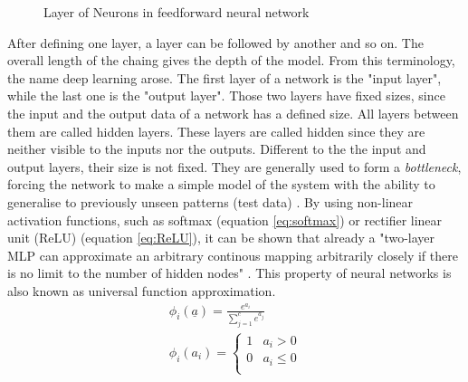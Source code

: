 \documentclass[12pt,DIV14,BCOR12mm,a4paper,footexclude,headinclude,halfparskip-,twoside,openright,openany,cleardoubleempty,idxtotoc,bibtotoc]{scrreprt} %
\numberwithin{equation}{chapter}
\begin{document}
\begin{figure}[htb!]
	\centering
	\qquad
	\caption{Layer of Neurons in feedforward neural network}
	\label{fig:Layer_of_neurons}
\end{figure}
After defining one layer, a layer can be followed by another and so on. The overall length of the chaing gives the depth of the model. From this terminology, the name deep learning arose. The first layer of a network is the "input layer", while the last one is the "output layer". Those two layers have fixed sizes, since the input and the output data of a network has a defined size. All layers between them are called hidden layers. These layers are called hidden since they are neither visible to the inputs nor the outputs. Different to the the input and output layers, their size is not fixed. They are generally used to form a \textit{bottleneck}, forcing the network to make a simple model of the system with the ability to generalise to previously unseen patterns (test data) \cite{Michie-et-al-1994}. By using non-linear activation functions, such as softmax (equation \ref{eq:softmax}) or rectifier linear unit (ReLU) (equation \ref{eq:ReLU}), it can be shown that already a "two-layer MLP can approximate an arbitrary continous mapping arbitrarily closely if there is no limit to the number of hidden nodes" \cite{Michie-et-al-1994}. This property of neural networks is also known as universal function approximation.
\begin{align}
	\phi_{i}(\underline{a}) = \frac{e^{a_{i}}}{\sum_{j=1}^{c}e^{a_{j}}} \label{eq:softmax}\\
	\phi_{i}(a_{i}) = \begin{cases} 1 & a_{i} > 0\\0 & a_{i} \leq 0\\ \end{cases} \label{eq:ReLU}
\end{align}
\end{document}
